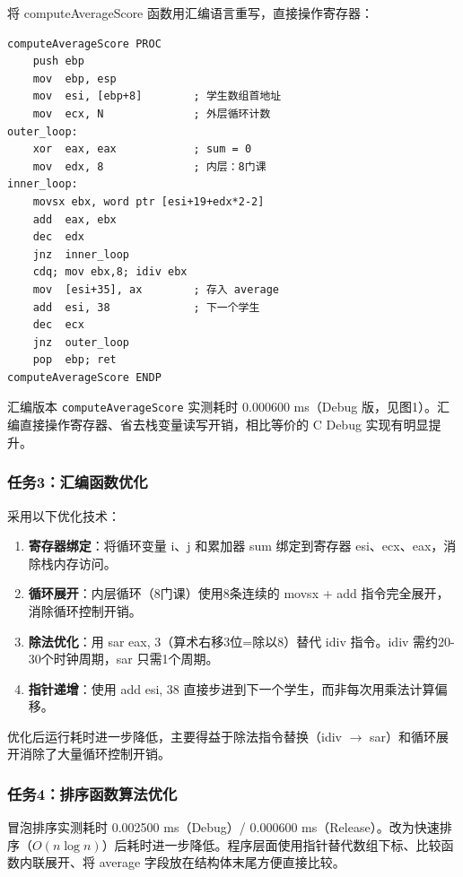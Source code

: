 将 computeAverageScore 函数用汇编语言重写，直接操作寄存器：

\begin{lstlisting}
computeAverageScore PROC
    push ebp
    mov  ebp, esp
    mov  esi, [ebp+8]        ; 学生数组首地址
    mov  ecx, N              ; 外层循环计数
outer_loop:
    xor  eax, eax            ; sum = 0
    mov  edx, 8              ; 内层：8门课
inner_loop:
    movsx ebx, word ptr [esi+19+edx*2-2]
    add  eax, ebx
    dec  edx
    jnz  inner_loop
    cdq; mov ebx,8; idiv ebx
    mov  [esi+35], ax        ; 存入 average
    add  esi, 38             ; 下一个学生
    dec  ecx
    jnz  outer_loop
    pop  ebp; ret
computeAverageScore ENDP
\end{lstlisting}

汇编版本 \texttt{computeAverageScore} 实测耗时 0.000600 ms（Debug 版，见图1）。汇编直接操作寄存器、省去栈变量读写开销，相比等价的 C Debug 实现有明显提升。

\subsubsection*{任务3：汇编函数优化}

采用以下优化技术：
\begin{enumerate}[label=（\arabic*）,nosep]
    \item \textbf{寄存器绑定}：将循环变量 i、j 和累加器 sum 绑定到寄存器 esi、ecx、eax，消除栈内存访问。
    \item \textbf{循环展开}：内层循环（8门课）使用8条连续的 movsx + add 指令完全展开，消除循环控制开销。
    \item \textbf{除法优化}：用 sar eax, 3（算术右移3位=除以8）替代 idiv 指令。idiv 需约20-30个时钟周期，sar 只需1个周期。
    \item \textbf{指针递增}：使用 add esi, 38 直接步进到下一个学生，而非每次用乘法计算偏移。
\end{enumerate}

优化后运行耗时进一步降低，主要得益于除法指令替换（idiv $\to$ sar）和循环展开消除了大量循环控制开销。

\subsubsection*{任务4：排序函数算法优化}

冒泡排序实测耗时 0.002500 ms（Debug）/ 0.000600 ms（Release）。改为快速排序（$O(n \log n)$）后耗时进一步降低。程序层面使用指针替代数组下标、比较函数内联展开、将 average 字段放在结构体末尾方便直接比较。

